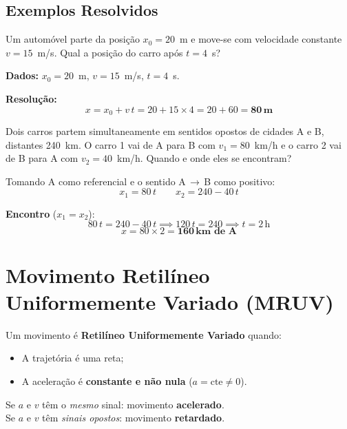 \documentclass[12pt,a4paper]{article}
\begin{document}
\subsection{Exemplos Resolvidos}

\begin{tcolorbox}[exemplobox={Exemplo 1 --- Equa\c{c}\~ao hor\'aria}]
  Um autom\'ovel parte da posi\c{c}\~ao $x_0 = 20$~m e move-se com velocidade
  constante $v = 15$~m/s. Qual a posi\c{c}\~ao do carro ap\'os $t = 4$~s?

  \medskip
  \textbf{Dados:} $x_0 = 20$~m,\; $v = 15$~m/s,\; $t = 4$~s.

  \medskip
  \textbf{Resolu\c{c}\~ao:}
  \[
    x = x_0 + v\,t = 20 + 15 \times 4 = 20 + 60 = \mathbf{80\,\text{m}}
  \]
\end{tcolorbox}

\begin{tcolorbox}[exemplobox={Exemplo 2 --- Encontro de dois m\'oveis}]
  Dois carros partem simultaneamente em sentidos opostos de cidades A e B,
  distantes 240~km. O carro 1 vai de A para B com $v_1 = 80$~km/h e o carro 2
  vai de B para A com $v_2 = 40$~km/h. Quando e onde eles se encontram?

  \medskip
  Tomando A como referencial e o sentido A\,$\to$\,B como positivo:
  \[
    x_1 = 80\,t \qquad x_2 = 240 - 40\,t
  \]

  \textbf{Encontro} ($x_1 = x_2$):
  \[
    80\,t = 240 - 40\,t \implies 120\,t = 240 \implies t = 2\,\text{h}
  \]
  \[
    x = 80 \times 2 = \mathbf{160\,\text{km de A}}
  \]
\end{tcolorbox}


\section{Movimento Retil\'ineo Uniformemente Variado (MRUV)}

\begin{tcolorbox}[defbox={Defini\c{c}\~ao: MRUV}]
  Um movimento \'e \textbf{Retil\'ineo Uniformemente Variado} quando:
  \begin{itemize}[nosep]
    \item A trajet\'oria \'e uma reta;
    \item A acelera\c{c}\~ao \'e \textbf{constante e n\~ao nula} ($a = \text{cte} \neq 0$).
  \end{itemize}
  Se $a$ e $v$ t\^em o \emph{mesmo} sinal: movimento \textbf{acelerado}.\\
  Se $a$ e $v$ t\^em \emph{sinais opostos}: movimento \textbf{retardado}.
\end{tcolorbox}
\end{document}
